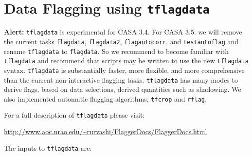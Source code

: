 
\section{Data Flagging using {\tt tflagdata}}
\label{section:edit.tflagdata}

{\bf Alert:} {\tt tflagdata} is experimental for CASA 3.4. For CASA
3.5. we will remove the current tasks {\tt flagdata}, {\tt flagdata2},
{\tt flagautocorr}, and {\tt testautoflag} and rename {\tt tflagdata}
to {\tt flagdata}. So we recommend to become familiar with {\tt
  tflagdata} and recommend that scripts may be written to use the new
{\tt tflagdata} syntax. {\tt tflagdata} is substantially faster, more
flexible, and more comprehensive than the current non-interactive
flagging tasks. {\tt tflagdata} has many modes to derive flags, based
on data selections, derived quantities such as shadowing. We also
implemented automatic flagging algorithms, {\tt tfcrop} and {\tt rflag}. 

For a full description of {\tt tflagdata} please visit:

\url{http://www.aoc.nrao.edu/\~rurvashi/FlaggerDocs/FlaggerDocs.html}

The inputs to {\tt tflagdata} are:

